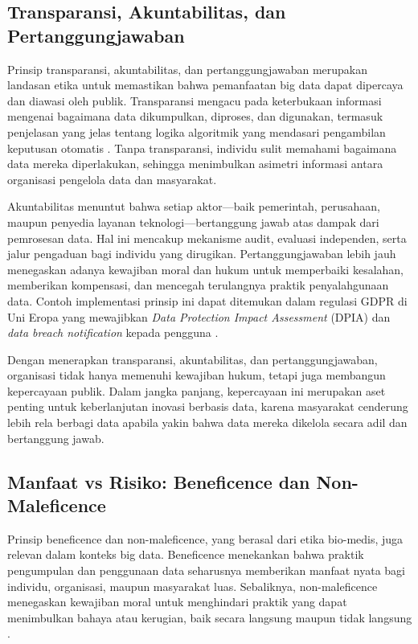 \subsection{Transparansi, Akuntabilitas, dan Pertanggungjawaban}

Prinsip transparansi, akuntabilitas, dan pertanggungjawaban merupakan landasan etika untuk memastikan bahwa pemanfaatan big data dapat dipercaya dan diawasi oleh publik. Transparansi mengacu pada keterbukaan informasi mengenai bagaimana data dikumpulkan, diproses, dan digunakan, termasuk penjelasan yang jelas tentang logika algoritmik yang mendasari pengambilan keputusan otomatis \cite{mittelstadt2016ethics}. Tanpa transparansi, individu sulit memahami bagaimana data mereka diperlakukan, sehingga menimbulkan asimetri informasi antara organisasi pengelola data dan masyarakat.  

Akuntabilitas menuntut bahwa setiap aktor—baik pemerintah, perusahaan, maupun penyedia layanan teknologi—bertanggung jawab atas dampak dari pemrosesan data. Hal ini mencakup mekanisme audit, evaluasi independen, serta jalur pengaduan bagi individu yang dirugikan. Pertanggungjawaban lebih jauh menegaskan adanya kewajiban moral dan hukum untuk memperbaiki kesalahan, memberikan kompensasi, dan mencegah terulangnya praktik penyalahgunaan data. Contoh implementasi prinsip ini dapat ditemukan dalam regulasi GDPR di Uni Eropa yang mewajibkan \textit{Data Protection Impact Assessment} (DPIA) dan \textit{data breach notification} kepada pengguna \cite{voigt2017gdpr}.  

Dengan menerapkan transparansi, akuntabilitas, dan pertanggungjawaban, organisasi tidak hanya memenuhi kewajiban hukum, tetapi juga membangun kepercayaan publik. Dalam jangka panjang, kepercayaan ini merupakan aset penting untuk keberlanjutan inovasi berbasis data, karena masyarakat cenderung lebih rela berbagi data apabila yakin bahwa data mereka dikelola secara adil dan bertanggung jawab.

\subsection{Manfaat vs Risiko: Beneficence dan Non-Maleficence}

Prinsip beneficence dan non-maleficence, yang berasal dari etika bio-medis, juga relevan dalam konteks big data. Beneficence menekankan bahwa praktik pengumpulan dan penggunaan data seharusnya memberikan manfaat nyata bagi individu, organisasi, maupun masyarakat luas. Sebaliknya, non-maleficence menegaskan kewajiban moral untuk menghindari praktik yang dapat menimbulkan bahaya atau kerugian, baik secara langsung maupun tidak langsung \cite{beauchamp2019principles}.  

